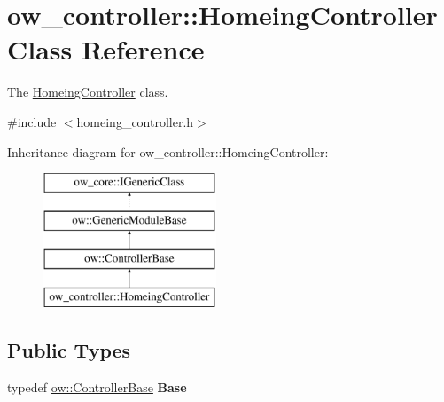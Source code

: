 \hypertarget{classow__controller_1_1HomeingController}{}\section{ow\+\_\+controller\+:\+:Homeing\+Controller Class Reference}
\label{classow__controller_1_1HomeingController}


The \hyperlink{classow__controller_1_1HomeingController}{Homeing\+Controller} class.  




{\ttfamily \#include $<$homeing\+\_\+controller.\+h$>$}

Inheritance diagram for ow\+\_\+controller\+:\+:Homeing\+Controller\+:\begin{figure}[H]
\begin{center}
\leavevmode
\includegraphics[height=4.000000cm]{de/d6a/classow__controller_1_1HomeingController}
\end{center}
\end{figure}
\subsection*{Public Types}
\begin{DoxyCompactItemize}
\item 
typedef \hyperlink{classow_1_1ControllerBase}{ow\+::\+Controller\+Base} {\bfseries Base}\hypertarget{classow__controller_1_1HomeingController_a2fd2e36683df7e94da7b107f216a8f2b}{}\label{classow__controller_1_1HomeingController_a2fd2e36683df7e94da7b107f216a8f2b}

\end{DoxyCompactItemize}
